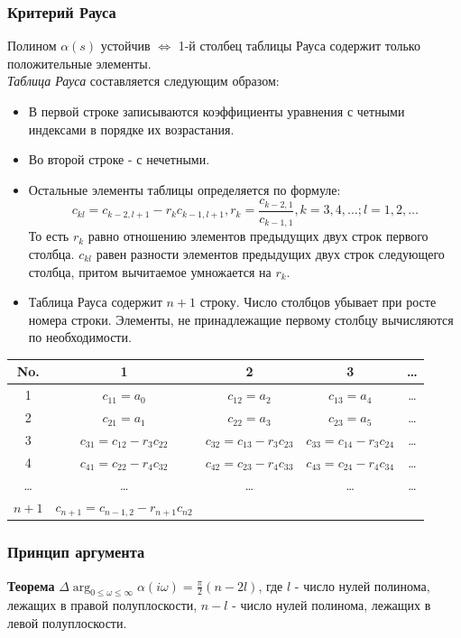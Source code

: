 \documentclass[A4]{article}
\begin{document}
\subsubsection{Критерий Рауса}
Полином $\alpha(s)$ устойчив $\Leftrightarrow$ 1-й столбец таблицы Рауса содержит только положительные элементы.\\
\emph{Таблица Рауса} составляется следующим образом:
\begin{itemize}
	\item В первой строке записываются коэффициенты уравнения с четными индексами в порядке их возрастания.
	\item Во второй строке - с нечетными.
	\item Остальные элементы таблицы определяется по формуле:
	\begin{equation}
	c_{kl}=c_{k-2,l+1}-r_kc_{k-1,l+1},r_k=\frac{c_{k-2,1}}{c_{k-1,1}},k=3,4,\ldots;l=1,2,\ldots
	\end{equation}
	То есть $r_k$ равно отношению элементов предыдущих двух строк первого столбца. $c_{kl}$ равен разности элементов предыдущих двух строк следующего столбца, притом вычитаемое умножается на $r_k$.
	\item Таблица Рауса содержит $n+1$ строку. Число столбцов убывает при росте номера строки. Элементы, не принадлежащие первому столбцу вычисляются по необходимости.
\end{itemize}
\begin{table}[]
	\label{1}
	\centering
	\begin{tabular}{|c|c|c|c|c|}
		\hline
		No.& 1&2&3&\ldots  \\ \hline
		1 &    $c_{11}=a_0$ & $c_{12}=a_2$ &    $c_{13}=a_4$   &\ldots        \\ \hline
		2 &   $c_{21}=a_1$&  $c_{22}=a_3$   &   $c_{23}=a_5$   &\ldots        \\ \hline
		3 & $c_{31}=c_{12}-r_3c_{22}$& $c_{32}=c_{13}-r_3c_{23}$ &    $c_{33}=c_{14}-r_3c_{24}$   &  \ldots      \\ \hline
		4&        $c_{41}=c_{22}-r_4c_{32}$ & $c_{42}=c_{23}-r_4c_{33}$     &   $c_{43}=c_{24}-r_4c_{34}$       &   \ldots      \\ \hline
		\ldots&        \ldots    &  \ldots    &   \ldots       &  \ldots         \\ \hline
		$n+1$&      $c_{n+1}=c_{n-1,2}-r_{n+1}c_{n2}$  & & &      \\ \hline
	\end{tabular}
\end{table}
\subsubsection{Принцип аргумента}
\textbf{Теорема} $\Delta \arg_{0\le\omega\le\infty}\alpha(i\omega)=\frac{\pi}{2}(n-2l)$, где $l$ - число нулей полинома, лежащих в правой полуплоскости, $n-l$ -  число нулей полинома, лежащих в левой полуплоскости.
\end{document}
